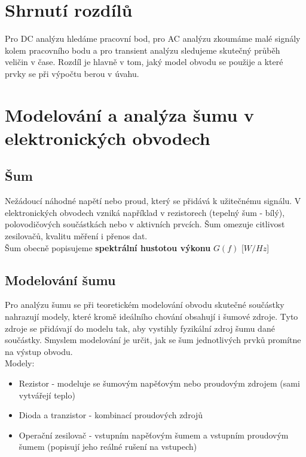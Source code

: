 \section{Shrnutí rozdílů}
Pro DC analýzu hledáme pracovní bod, pro AC analýzu zkoumáme malé signály kolem pracovního bodu a pro transient analýzu sledujeme skutečný průběh veličin v čase. Rozdíl je hlavně v tom, jaký model obvodu se použije a které prvky se při výpočtu berou v úvahu.

\section{Modelování a analýza šumu v elektronických obvodech}
\subsection{Šum}
Nežádoucí náhodné napětí nebo proud, který se přidává k užitečnému signálu. V elektronických obvodech vzniká například v rezistorech (tepelný šum - bílý), polovodičových součástkách nebo v aktivních prvcích. Šum omezuje citlivost zesilovačů, kvalitu měření i přenos dat.\\
Šum obecně popisujeme \textbf{spektrální hustotou výkonu} $G(f)$ [$W/Hz$]
\subsection{Modelování šumu}
Pro analýzu šumu se při teoretickém modelování obvodu skutečné součástky nahrazují modely, které kromě ideálního chování obsahují i šumové zdroje. Tyto zdroje se přidávají do modelu tak, aby vystihly fyzikální zdroj šumu dané součástky. Smyslem modelování je určit, jak se šum jednotlivých prvků promítne na výstup obvodu.\\
Modely:
\begin{itemize}
	\item Rezistor - modeluje se šumovým napěťovým nebo proudovým zdrojem (sami vytvářejí teplo)
	\item Dioda a tranzistor - kombinací proudových zdrojů
	\item Operační zesilovač - vstupním napěťovým šumem a vstupním proudovým šumem (popisují jeho reálné rušení na vstupech)
\end{itemize}
